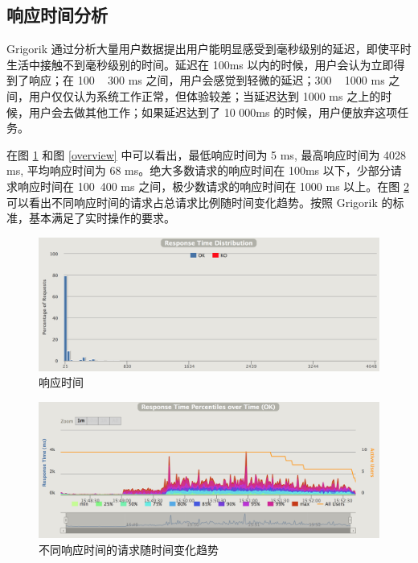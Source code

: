 \subsection{响应时间分析}

Grigorik 通过分析大量用户数据提出用户能明显感受到毫秒级别的延迟，即使平时生活中接触不到毫秒级别的时间。延迟在 100ms 以内的时候，用户会认为立即得到了响应；在 100 ~ 300 ms 之间，用户会感觉到轻微的延迟；300 ~ 1000 ms 之间，用户仅仅认为系统工作正常，但体验较差；当延迟达到 1000 ms 之上的时候，用户会去做其他工作；如果延迟达到了 10 000ms 的时候，用户便放弃这项任务。 

在图 \ref{response} 和图 \ref{overview} 中可以看出，最低响应时间为 5 ms, 最高响应时间为 4028 ms, 平均响应时间为 68 ms。绝大多数请求的响应时间在 100ms 以下，少部分请求响应时间在 100~400 ms 之间，极少数请求的响应时间在 1000 ms 以上。在图 \ref{overtime} 可以看出不同响应时间的请求占总请求比例随时间变化趋势。按照 Grigorik 的标准，基本满足了实时操作的要求。

\begin{figure}
\centering
\includegraphics[width=148mm]{images/response}
\caption{响应时间}
\label{response}
\end{figure}

\begin{figure}
\centering
\includegraphics[width=148mm]{images/overtime}
\caption{不同响应时间的请求随时间变化趋势}
\label{overtime}
\end{figure}


